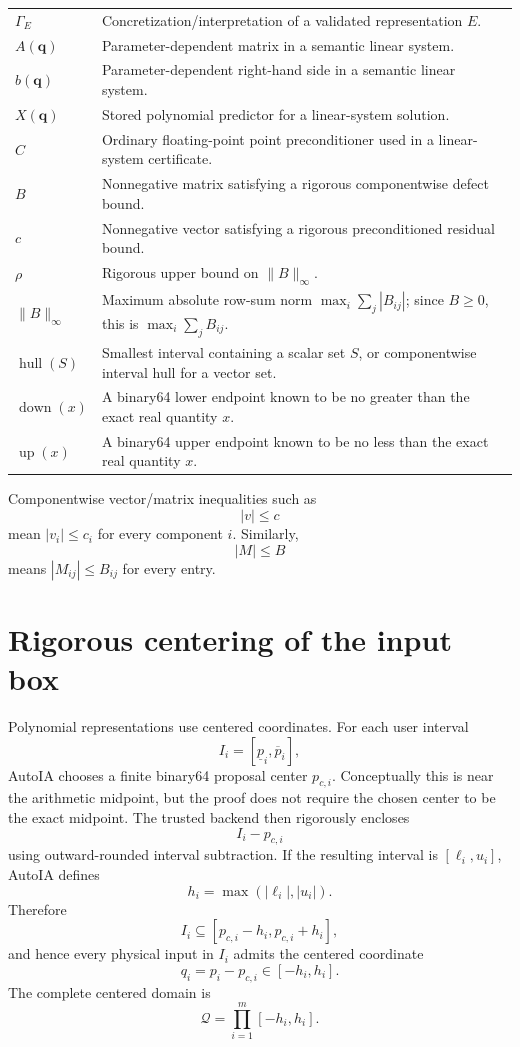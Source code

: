 \documentclass[11pt]{article}
\newcommand{\Qdom}{\mathcal{Q}}
\newcommand{\Hull}{\operatorname{hull}}
\newcommand{\down}{\operatorname{down}}
\newcommand{\up}{\operatorname{up}}
\newcommand{\qv}{\mathbf{q}}
\begin{document}
\begin{longtable}{p{}p{}}
\(\Gamma_E\) & Concretization/interpretation of a validated representation \(E\). \\
\(A(\qv)\) & Parameter-dependent matrix in a semantic linear system. \\
\(b(\qv)\) & Parameter-dependent right-hand side in a semantic linear system. \\
\(X(\qv)\) & Stored polynomial predictor for a linear-system solution. \\
\(C\) & Ordinary floating-point point preconditioner used in a linear-system certificate. \\
\(B\) & Nonnegative matrix satisfying a rigorous componentwise defect bound. \\
\(c\) & Nonnegative vector satisfying a rigorous preconditioned residual bound. \\
\(\rho\) & Rigorous upper bound on \(\|B\|_\infty\). \\
\(\|B\|_\infty\) & Maximum absolute row-sum norm \(\max_i\sum_j |B_{ij}|\); since \(B\ge0\), this is \(\max_i\sum_jB_{ij}\). \\
\(\Hull(S)\) & Smallest interval containing a scalar set \(S\), or componentwise interval hull for a vector set. \\
\(\down(x)\) & A binary64 lower endpoint known to be no greater than the exact real quantity \(x\). \\
\(\up(x)\) & A binary64 upper endpoint known to be no less than the exact real quantity \(x\). \\
\bottomrule
\end{longtable}

Componentwise vector/matrix inequalities such as
\[
  |v|\le c
\]
mean \(|v_i|\le c_i\) for every component \(i\).  Similarly,
\[
  |M|\le B
\]
means \(|M_{ij}|\le B_{ij}\) for every entry.

\section{Rigorous centering of the input box}

Polynomial representations use centered coordinates.  For each user interval
\[
  I_i=[\underline p_i,\overline p_i],
\]
AutoIA chooses a finite binary64 proposal center \(p_{c,i}\).  Conceptually this
is near the arithmetic midpoint, but the proof does not require the chosen center
to be the exact midpoint.  The trusted backend then rigorously encloses
\[
  I_i-p_{c,i}
\]
using outward-rounded interval subtraction.  If the resulting interval is
\([\ell_i,u_i]\), AutoIA defines
\[
  h_i=\max(|\ell_i|,|u_i|).
\]
Therefore
\[
  I_i\subseteq[p_{c,i}-h_i,p_{c,i}+h_i],
\]
and hence every physical input in \(I_i\) admits the centered coordinate
\[
  q_i=p_i-p_{c,i}\in[-h_i,h_i].
\]
The complete centered domain is
\[
  \Qdom=\prod_{i=1}^m[-h_i,h_i].
\]
\end{document}
